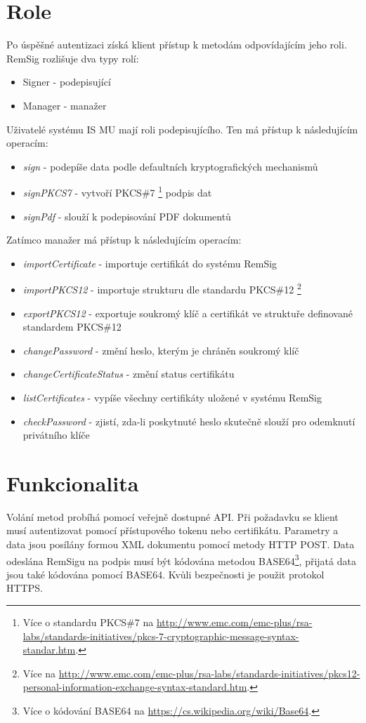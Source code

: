 \documentclass[]{fithesis3}
\begin{document}
	\section{Role} 	
	Po úspěšné autentizaci získá klient přístup k metodám odpovídajícím jeho roli. RemSig rozlišuje 		dva typy rolí:
	\begin{itemize}
		\item Signer - podepisující
		\item Manager - manažer
	\end{itemize}
	\newpage
	Uživatelé systému IS MU mají roli podepisujícího. Ten má přístup k následujícím operacím:
	\begin{itemize}
		\item \textit{sign} - podepíše data podle defaultních kryptografických mechanismů
		\item \textit{signPKCS7} - vytvoří PKCS\#7
			\footnote{Více o standardu PKCS\#7 na \url{http://www.emc.com/emc-plus/rsa-labs/standards-initiatives/pkcs-7-cryptographic-message-syntax-standar.htm}.} podpis dat
		\item \textit{signPdf} - slouží k podepisování PDF dokumentů
	\end{itemize}
	Zatímco manažer má přístup k následujícím operacím:
	\begin{itemize}
		\item \textit{importCertificate} - importuje certifikát do systému RemSig
		\item \textit{importPKCS12} - importuje strukturu dle standardu PKCS\#12
		\footnote{Více na \url{http://www.emc.com/emc-plus/rsa-labs/standards-initiatives/pkcs12-personal-information-exchange-syntax-standard.htm}.}
		\item \textit{exportPKCS12} - exportuje soukromý klíč a certifikát ve struktuře 					definované standardem PKCS\#12
		\item \textit{changePassword} - změní heslo, kterým je chráněn soukromý klíč
		\item \textit{changeCertificateStatus} - změní status certifikátu
		\item \textit{listCertificates} - vypíše všechny certifikáty uložené v systému RemSig
		\item \textit{checkPassword} - zjistí, zda-li poskytnuté heslo skutečně slouží pro 					odemknutí privátního klíče
	\end{itemize}

	\section{Funkcionalita}
	Volání metod probíhá pomocí veřejně dostupné API. Při požadavku se klient musí autentizovat 		pomocí přístupového tokenu nebo certifikátu. Parametry a data jsou posílány formou XML 			dokumentu pomocí metody HTTP POST. Data odeslána RemSigu na podpis musí být 				kódována metodou BASE64\footnote{Více o kódování BASE64 na \url{https://cs.wikipedia.org/wiki/Base64}.}, přijatá 		data jsou také kódována pomocí BASE64. Kvůli 	bezpečnosti je použit protokol HTTPS.
\end{document}
